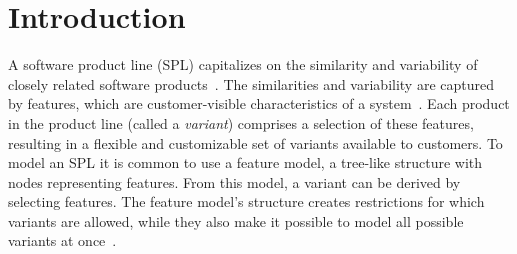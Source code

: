 



\chapter{Introduction}
\label{cha:introduction}

A software product line (SPL) capitalizes on the similarity and variability of closely related software products~\cite{book:introduction-to-spl}. The similarities and variability are captured by features, which are customer-visible characteristics of a system~\cite{book:introduction-to-spl}. Each product in the product line (called a \textit{variant}) comprises a selection of these features, resulting in a flexible and customizable set of variants available to customers. To model an SPL it is common to use a feature model, a tree-like structure with nodes representing features. From this model, a variant can be derived by selecting features. The feature model's structure creates restrictions for which variants are allowed, while they also make it possible to model all possible variants at once~\cite{art:feature-models-grammars-and-propositional-formulas}.

